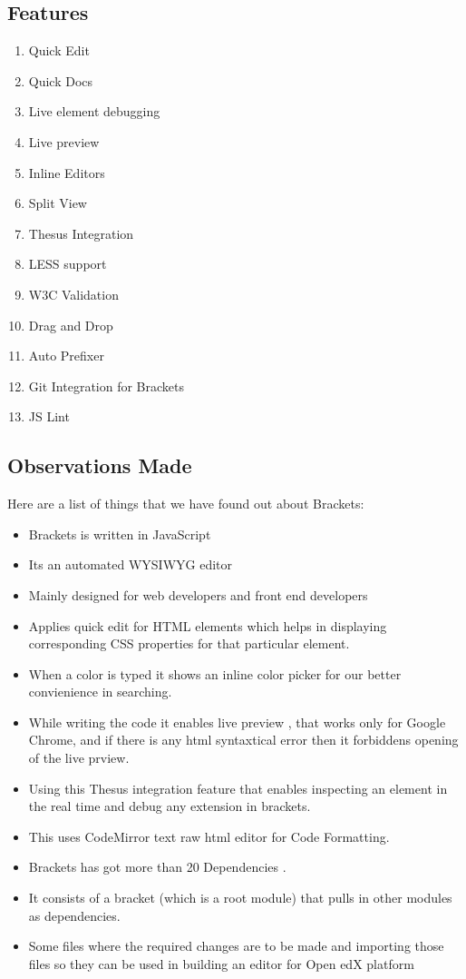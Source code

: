 \subsection{Features}
\begin{enumerate}
\item Quick Edit
\item Quick Docs
\item Live element debugging
\item Live preview
\item Inline Editors
\item Split View
\item Thesus Integration
\item LESS support
\item W3C Validation
\item Drag and Drop
\item Auto Prefixer
\item Git Integration for Brackets
\item JS Lint
\end{enumerate}
\subsection{Observations Made}
Here are a list of things that we have found out about Brackets: \newline
\begin{itemize}
\item Brackets is written in JavaScript
\item Its an automated WYSIWYG editor
\item Mainly designed for web developers and front end developers
\item Applies quick edit for HTML elements which helps in displaying corresponding CSS
properties for that particular element.
\item When a color is typed it shows an inline color picker for our better convienience in
searching.
\item While writing the code it enables live preview , that works only for Google Chrome, and if
there is any html syntaxtical error then it forbiddens opening of the live prview.
\item Using this Thesus integration feature that enables inspecting an element in the real time and
debug any extension in brackets.
\item This uses CodeMirror text raw html editor for Code Formatting.
\item Brackets has got more than 20 Dependencies .
\item It consists of a bracket (which is a root module) that pulls in other modules as dependencies.
\item Some files where the required changes are to be made and importing those files so they can
be used in building an editor for Open edX platform
\end{itemize}
